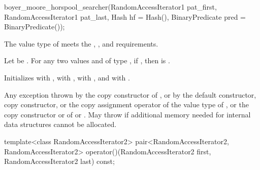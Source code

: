%
\begin{itemdecl}
boyer_moore_horspool_searcher(RandomAccessIterator1 pat_first,
                              RandomAccessIterator1 pat_last,
                              Hash hf = Hash(),
                              BinaryPredicate pred = BinaryPredicate());
\end{itemdecl}

\begin{itemdescr}
\pnum
\expects
The value type of  meets the ,
, and  requirements.

\pnum
Let  be .
For any two values  and  of type ,
if , then  is .

\pnum
\effects
Initializes
 with ,
 with ,
 with , and
\mbox{} with .

\pnum
\throws
Any exception thrown by the copy constructor of ,
or by the default constructor, copy constructor, or the copy assignment operator of the value type of ,
or the copy constructor or  of  or .
May throw  if additional memory needed for internal data structures cannot be allocated.
\end{itemdescr}

%
\begin{itemdecl}
template<class RandomAccessIterator2>
  pair<RandomAccessIterator2, RandomAccessIterator2>
    operator()(RandomAccessIterator2 first, RandomAccessIterator2 last) const;
\end{itemdecl}

